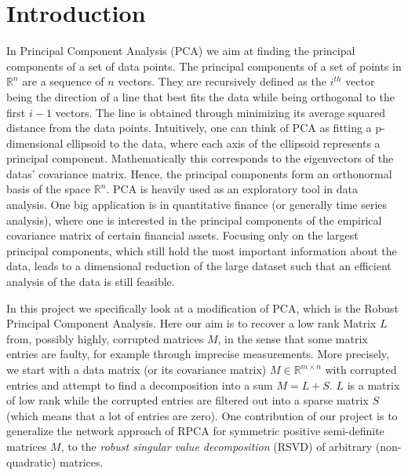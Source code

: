 \section{Introduction}

In Principal Component Analysis (PCA) we aim at finding the principal components of a set of data points. The principal components of a set of points in $\mathbb{R}^n$ are a sequence of $n$ vectors. They are recursively defined as the $i^{th}$ vector being the direction of a line that best fits the data while being orthogonal to the first $i-1$ vectors. The line is obtained through minimizing its average squared distance from the data points. Intuitively, one can think of PCA as fitting a p-dimensional ellipsoid to the data, where each axis of the ellipsoid represents a principal component. Mathematically this corresponds to the eigenvectors of the datas' covariance matrix. Hence, the principal components form an orthonormal basis of the space $\mathbb{R}^n$. PCA is heavily used as an exploratory tool in data analysis. One big application is in quantitative finance (or generally time series analysis), where one is interested in the principal components of the empirical covariance matrix of certain financial assets. Focusing only on the largest principal components, which still hold the most important information about the data, leads to a dimensional reduction of the large dataset such that an efficient analysis of the data is still feasible.

In this project we specifically look at a modification of PCA, which is the Robust Principal Component Analysis. Here our aim is to recover a low rank Matrix $L$ from, possibly highly, corrupted matrices $M$, in the sense that some matrix entries are faulty, for example through imprecise measurements. More precisely, we start with a data matrix (or its covariance matrix) $M \in \mathbb{R}^{m \times n}$ with corrupted entries and attempt to find a decomposition into a sum $M = L + S$. $L$ is a matrix of low rank while the corrupted entries are filtered out into a sparse matrix $S$ (which means that a lot of entries are zero). One contribution of our project is to generalize the network approach of RPCA for symmetric positive semi-definite matrices $M$, to the \textit{robust singular value decomposition} (RSVD) of arbitrary (non-quadratic) matrices.

